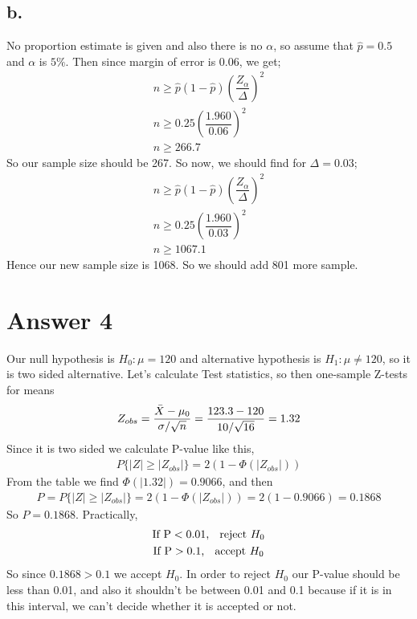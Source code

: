 \documentclass[12pt]{article}
\begin{document}
\subsection*{b.}
No proportion estimate is given and also there is no $\alpha$, so assume that $\hat{p} = 0.5$ and $\alpha$ is $5\%$. Then since margin of error is $0.06$, we get;
\begin{gather*}
        n \geq \hat{p} (1-\hat{p}) (\dfrac{Z_{\alpha}}{\Delta})^2 \\
        n \geq 0.25 (\dfrac{1.960}{0.06})^2 \\
        n \geq 266.7
\end{gather*}
So our sample size should be 267. So now, we should find for $\Delta = 0.03$;
\begin{gather*}
    n \geq \hat{p} (1-\hat{p}) (\dfrac{Z_{\alpha}}{\Delta})^2 \\
    n \geq 0.25 (\dfrac{1.960}{0.03})^2 \\
    n \geq 1067.1
\end{gather*}
Hence our new sample size is 1068. So we should add 801 more sample.
\section*{Answer 4}
Our null hypothesis is $H_0: \mu = 120$ and alternative hypothesis is $H_1: \mu \neq 120$, so it is two sided alternative. Let's calculate Test statistics, so then one-sample Z-tests for means 
\begin{gather*}
    Z_{obs} = \dfrac{\Bar{X}- \mu_0}{\sigma / \sqrt{n}} = \dfrac{123.3-120}{10/\sqrt{16}} = 1.32
\end{gather*}
Since it is two sided we calculate P-value like this,
\begin{gather*}
    P\{|Z| \geq |Z_{obs}|\} = 2(1-\Phi(|Z_{obs}|))
\end{gather*}
From the table we find $\Phi(|1.32|) = 0.9066$, and then 
\begin{gather*}
    P=P\{|Z| \geq |Z_{obs}|\} = 2(1-\Phi(|Z_{obs}|)) = 2(1-0.9066) = 0.1868
\end{gather*}
So $P=0.1868$. Practically, 
\begin{gather*}
    \text{If   P} < \text{0.01, \;     reject }H_0 \\
    \text{If   P} > \text{0.1,  \;     accept }H_0
\end{gather*}
So since $0.1868 > 0.1$ we accept $H_0$. In order to reject $H_0$ our P-value should be less than 0.01, and also it shouldn't be between 0.01 and 0.1 because if it is in this interval, we can't decide whether it is accepted or not.
\end{document}
